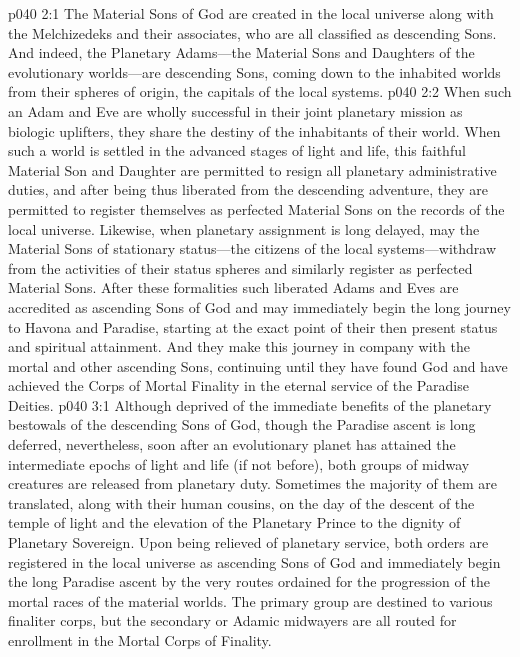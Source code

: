 \vs p040 2:1 The Material Sons of God are created in the local universe along with the Melchizedeks and their associates, who are all classified as descending Sons. And indeed, the Planetary Adams---the Material Sons and Daughters of the evolutionary worlds---are descending Sons, coming down to the inhabited worlds from their spheres of origin, the capitals of the local systems.
\vs p040 2:2 When such an Adam and Eve are wholly successful in their joint planetary mission as biologic uplifters, they share the destiny of the inhabitants of their world. When such a world is settled in the advanced stages of light and life, this faithful Material Son and Daughter are permitted to resign all planetary administrative duties, and after being thus liberated from the descending adventure, they are permitted to register themselves as perfected Material Sons on the records of the local universe. Likewise, when planetary assignment is long delayed, may the Material Sons of stationary status---the citizens of the local systems---withdraw from the activities of their status spheres and similarly register as perfected Material Sons. After these formalities such liberated Adams and Eves are accredited as ascending Sons of God and may immediately begin the long journey to Havona and Paradise, starting at the exact point of their then present status and spiritual attainment. And they make this journey in company with the mortal and other ascending Sons, continuing until they have found God and have achieved the Corps of Mortal Finality in the eternal service of the Paradise Deities.\plusone
{}
\vs p040 3:1 Although deprived of the immediate benefits of the planetary bestowals of the descending Sons of God, though the Paradise ascent is long deferred, nevertheless, soon after an evolutionary planet has attained the intermediate epochs of light and life (if not before), both groups of midway creatures are released from planetary duty. Sometimes the majority of them are translated, along with their human cousins, on the day of the descent of the temple of light and the elevation of the Planetary Prince to the dignity of Planetary Sovereign. Upon being relieved of planetary service, both orders are registered in the local universe as ascending Sons of God and immediately begin the long Paradise ascent by the very routes ordained for the progression of the mortal races of the material worlds. The primary group are destined to various finaliter corps, but the secondary or Adamic midwayers are all routed for enrollment in the Mortal Corps of Finality.
